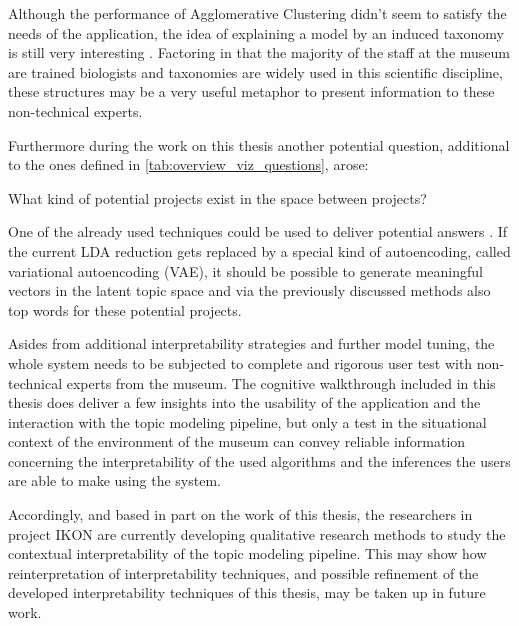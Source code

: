 Although the performance of Agglomerative Clustering didn't seem to satisfy the needs of the application, the idea of explaining a model by an induced taxonomy is still very interesting \cite{Liu:2018:INE:3219819.3220001}. Factoring in that the majority of the staff at the museum are trained biologists and taxonomies are widely used in this scientific discipline, these structures may be a very useful metaphor to present information to these non-technical experts.

Furthermore during the work on this thesis another potential question, additional to the ones defined in \autoref{tab:overview_viz_questions}, arose:
\begin{center}
	What kind of potential projects exist in the space between projects?
\end{center}
One of the already used techniques could be used to deliver potential answers . If the current LDA reduction gets replaced by a special kind of autoencoding, called variational autoencoding (VAE), it should be possible to generate meaningful vectors in the latent topic space and via the previously discussed methods also top words for these potential projects. 

Asides from additional interpretability strategies and further model tuning, the whole system needs to be subjected to complete and rigorous user test with non-technical experts from the museum. The cognitive walkthrough included in this thesis does deliver a few insights into the usability of the application and the interaction with the topic modeling pipeline, but only a test in the situational context of the environment of the museum can convey reliable information concerning the interpretability of the used algorithms and the inferences the users are able to make using the system.

Accordingly, and based in part on the work of this thesis, the researchers in project IKON are currently developing qualitative research methods to study the contextual interpretability of the topic modeling pipeline. This may show how reinterpretation of interpretability techniques, and possible refinement of the developed interpretability techniques of this thesis, may be taken up in future work.
